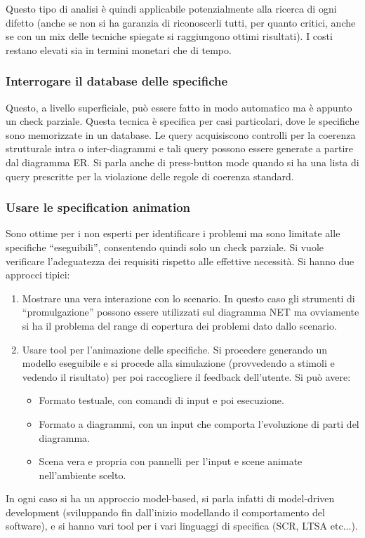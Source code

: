 Questo tipo di analisi è quindi applicabile potenzialmente alla ricerca di ogni
difetto (anche se non si ha garanzia di riconoscerli tutti, per quanto critici,
anche se con un mix delle tecniche spiegate si raggiungono ottimi risultati).
I costi restano elevati sia in termini monetari che di tempo.
\subsubsection{Interrogare il database delle specifiche}
Questo, a livello superficiale, può essere fatto in modo automatico ma è appunto
un check parziale. Questa tecnica è specifica per casi particolari, dove le
specifiche sono memorizzate in un database. Le query acquisiscono controlli per
la coerenza strutturale intra o inter-diagrammi e tali query possono essere
generate a partire dal diagramma ER. Si parla anche di press-button mode quando
si ha una lista di query prescritte per la violazione delle regole di coerenza
standard.
\subsubsection{Usare le specification animation}
Sono ottime per i non esperti per identificare i problemi ma sono limitate alle
specifiche “eseguibili”, consentendo quindi solo un check parziale. Si vuole
verificare l'adeguatezza dei requisiti rispetto alle effettive necessità. Si
hanno due approcci tipici:
\begin{enumerate}
      \item Mostrare una vera interazione con lo scenario. In questo caso gli
            strumenti di “promulgazione” possono essere utilizzati sul diagramma
            NET ma ovviamente si ha il problema del range di copertura dei
            problemi dato dallo scenario.
      \item Usare tool per l'animazione delle specifiche. Si procedere generando
            un modello eseguibile e si procede alla simulazione (provvedendo a
            stimoli e vedendo il risultato) per poi raccogliere il feedback
            dell'utente. Si può avere:
            \begin{itemize}
                  \item Formato testuale, con comandi di input e poi esecuzione.
                  \item Formato a diagrammi, con un input che comporta l'evoluzione
                        di parti del diagramma.
                  \item Scena vera e propria con pannelli per l'input e scene animate
                        nell'ambiente scelto.
            \end{itemize}
\end{enumerate}
In ogni caso si ha un approccio model-based, si parla infatti di model-driven
development (sviluppando fin dall'inizio modellando il comportamento del software),
e si hanno vari tool per i vari linguaggi di specifica (SCR, LTSA etc$\dots$).

